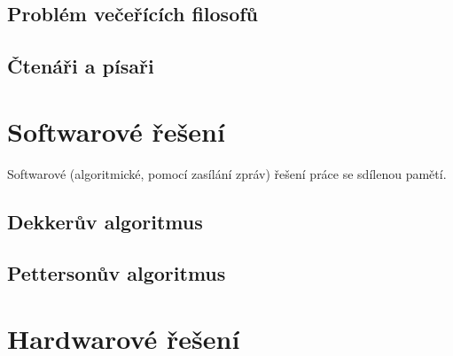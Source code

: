 \subsection{Problém večeřících filosofů}

\begin{compactitem}
    \item {}
\end{compactitem}

\subsection{Čtenáři a písaři}

\begin{compactitem}
    \item {}
\end{compactitem}


\section{Softwarové řešení}

\begin{compactitem}
    \item Softwarové (algoritmické, pomocí zasílání zpráv) řešení práce se sdílenou pamětí.
\end{compactitem}

\subsection{Dekkerův algoritmus}

\begin{compactitem}
    \item {}
\end{compactitem}

\subsection{Pettersonův algoritmus}

\begin{compactitem}
    \item {}
\end{compactitem}


\section{Hardwarové řešení}

